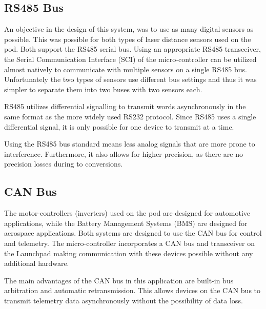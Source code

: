\subsection{RS485 Bus}

An objective in the design of this system, was to use as many digital sensors as possible. This was possible for both types of laser distance sensors used on the pod. Both support the RS485 serial bus. Using an appropriate RS485 transceiver, the Serial Communication Interface (SCI) of the micro-controller can be utilized almost natively to communicate with multiple sensors on a single RS485 bus. Unfortunately the two types of sensors use different bus settings and thus it was simpler to separate them into two buses with two sensors each.

RS485 utilizes differential signalling to transmit words asynchronously in the same format as the more widely used RS232 protocol. Since RS485 uses a single differential signal, it is only possible for one device to transmit at a time.

Using the RS485 bus standard means less analog signals that are more prone to interference. Furthermore, it also allows for higher precision, as there are no precision losses during to conversions.

\subsection{CAN Bus}

The motor-controllers (inverters) used on the pod are designed for automotive applications, while the Battery Management Systems (BMS) are designed for aerospace applications. Both systems are designed to use the CAN bus for control and telemetry. The micro-controller incorporates a CAN bus and transceiver on the Launchpad making communication with these devices possible without any additional hardware.

The main advantages of the CAN bus in this application are built-in bus arbitration and automatic retransmission. This allows devices on the CAN bus to transmit telemetry data asynchronously without the possibility of data loss.

